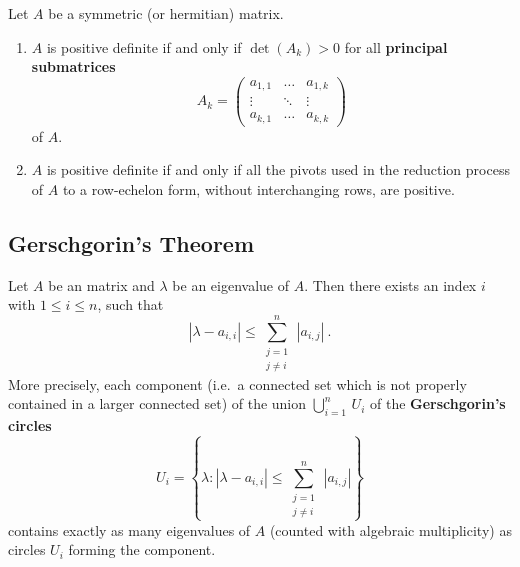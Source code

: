 \begin{theorem}
Let $A$ be a  symmetric (or hermitian) matrix.
\begin{enumerate}
\item $A$ is positive definite if and only if $\det(A_k) > 0$ for all
{\bfseries principal submatrices}
\[
A_k = \begin{pmatrix}
a_{1,1} & \ldots & a_{1,k} \\
\vdots & \ddots & \vdots \\
a_{k,1} & \ldots & a_{k,k}
\end{pmatrix}
\]
of $A$.
\item $A$ is positive definite if and only if all the pivots used in the
reduction process of $A$ to a row-echelon form, without interchanging
rows, are positive.
\end{enumerate}
\end{theorem}

\subsection{Gerschgorin's Theorem}

\begin{theorem}
Let $A$ be an  matrix and $\lambda$ be an eigenvalue of $A$.  Then
there exists an index $i$ with $1\leq i \leq n$, such that
\[
|\lambda - a_{i,i}| \leq \sum_{\substack{j=1\\ j\neq i}}^n\,|a_{i,j}| \ .
\]
More precisely, each component (i.e.\ a connected set which is not properly
contained in a larger connected set) of the union
$\displaystyle \bigcup_{i=1}^n\,U_i$ of the
{\bfseries Gerschgorin's circles}
\[
U_i = \left\{ \lambda : |\lambda - a_{i,i}| \leq
\sum_{\substack{j=1\\ j\neq i}}^n\,|a_{i,j}| \right\}
\]
contains exactly as many eigenvalues of $A$ (counted with algebraic
multiplicity) as circles $U_i$ forming the component.
\end{theorem}

